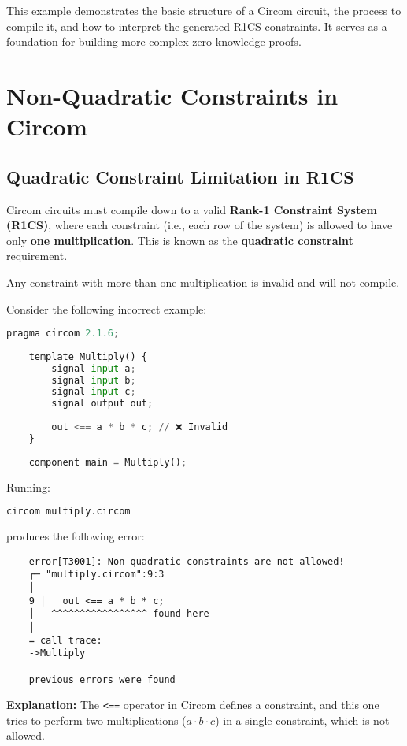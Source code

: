 \documentclass{article}
\begin{document}
This example demonstrates the basic structure of a Circom circuit, the process to compile it, and how to interpret the generated R1CS constraints. It serves as a foundation for building more complex zero-knowledge proofs.
	
\section{Non-Quadratic Constraints in Circom}

\subsection{Quadratic Constraint Limitation in R1CS}

Circom circuits must compile down to a valid \textbf{Rank-1 Constraint System (R1CS)}, where each constraint (i.e., each row of the system) is allowed to have only \textbf{one multiplication}. This is known as the \textbf{quadratic constraint} requirement.

Any constraint with more than one multiplication is invalid and will not compile.

Consider the following incorrect example:
\UseRawInputEncoding

\begin{lstlisting}[language=Python,caption={Invalid: More than one multiplication in one constraint}]
	pragma circom 2.1.6;
	
	template Multiply() {
		signal input a;
		signal input b;
		signal input c;
		signal output out;
		
		out <== a * b * c; // ❌ Invalid
	}
	
	component main = Multiply();
\end{lstlisting}

Running:
\begin{lstlisting}[language=bash]
	circom multiply.circom
\end{lstlisting}
produces the following error:

\begin{verbatim}
	error[T3001]: Non quadratic constraints are not allowed!
	┌─ "multiply.circom":9:3
	│
	9 │   out <== a * b * c;
	│   ^^^^^^^^^^^^^^^^^ found here
	│
	= call trace:
	->Multiply
	
	previous errors were found
\end{verbatim}

\textbf{Explanation:}  
The \texttt{<==} operator in Circom defines a constraint, and this one tries to perform two multiplications (\(a \cdot b \cdot c\)) in a single constraint, which is not allowed.
\end{document}
